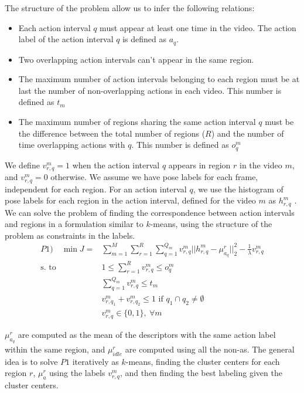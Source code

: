 \documentclass[11pt,letterpaper]{article}
\newcommand{\+}[1]{\ensuremath{{\boldsymbol #1}}}
\begin{document}
The structure of the problem allow us to infer the following relations:
\begin{itemize}
\item Each action interval $q$ must appear at least one time in the video. The action label of the action interval $q$ is defined as $a_q$.
\item Two overlapping action intervals can't appear in the same region.
\item The maximum number of action intervals belonging to each region must be at last the number of non-overlapping actions in each video. This number is defined as $t_m$
\item The maximum number of regions sharing the same action interval $q$ must be the difference between the total number of regions ($R$) and the number of time overlapping actions with $q$. This number is defined as $o_q^m$
\end{itemize}
We define $v_{r,q}^m=1$ when the action interval $q$ appears in region $r$ in the video $m$, and $v_{r,q}^m=0$ otherwise. We assume we have pose labels for each frame, independent for each region. For an action interval $q$, we use the histogram of pose labels for each region in the action interval, defined for the video $m$ as $h_{r,q}^m$ . We can solve the problem of finding the correspondence between action intervals and regions in a formulation similar to $k$-means, using the structure of the problem as constraints in the labels. 
\begin{equation}
\begin{split}
P1) \quad \min J= &\sum_{m=1}^M  \sum_{r=1}^R \sum_{q=1}^{Q_m}  v_{r,q}^m || h_{r,q}^m - \mu_{a_q}^r||_2^2 -\frac{1}{\lambda} v_{r,q}^m\\ 
 \text{s. to} 
\quad 
& 1 \le \sum_{r=1}^R v_{r,q}^m \le o_q^m \\ 
& \sum_{q=1}^{Q_m} v_{r,q}^m \le t_m \\ 
& v_{r,q_1}^m + v_{r,q_2}^m \le 1 \text{ if } q_1\cap q_2 \neq \emptyset \\  
& v_{r,q}^m \in \{0,1\},~\forall m
\end{split}
\end{equation}
 
$\mu_{a_q}^r$ are computed as the mean of the descriptors with the same action label within the same region, and $\mu_{idle}^r$ are computed using all the non-as. The general idea is to solve $P1$ iteratively as $k$-means,  finding the cluster centers for each region $r$, $\mu_{a}^r$ using the labels $v_{r,q}^m$, and then finding the best labeling given the cluster centers.
\end{document}

